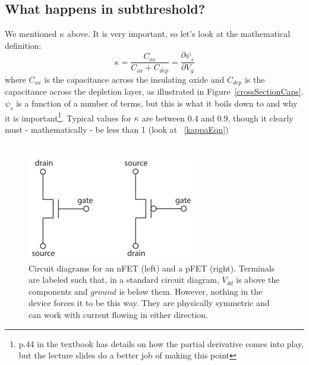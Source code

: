 \documentclass[main]{subfiles}
\begin{document}
\subsection{What happens in subthreshold?}
We mentioned $\kappa$ above. It is very important, so let's look at the mathematical definition:
\begin{equation}
\kappa = \frac{C_{ox}}{C_{ox} + C_{dep}} = \frac{\partial\psi_s}{\partial V_g}
\label{kappaEqn}
\end{equation}
where $C_{ox}$ is the capacitance across the insulating oxide and $C_{dep}$ is the capacitance across the depletion layer, as illustrated in Figure~\ref{crossSectionCaps}. $\psi_s$ is a function of a number of terms, but this is what it boils down to and why it is important\footnote{p.44 in the textbook has details on how the partial derivative comes into play, but the lecture slides do a better job of making this point}. Typical values for $\kappa$ are between 0.4 and 0.9, though it clearly must - mathematically - be less than 1 (look at ~\eqref{kappaEqn}) \\ \\
\begin{figure}[H]
\centering
\includegraphics[width=0.5\linewidth]{figs/nme_mosfets.pdf}
\caption{Circuit diagrams for an nFET (left) and a pFET (right). Terminals are labeled such that, in a standard circuit diagram, $V_{dd}$ is above the components and $ground$ is below them. However, nothing in the device forces it to be this way. They are physically symmetric and can work with current flowing in either direction. \label{mosfetsFig}}
\end{figure}
\end{document}
